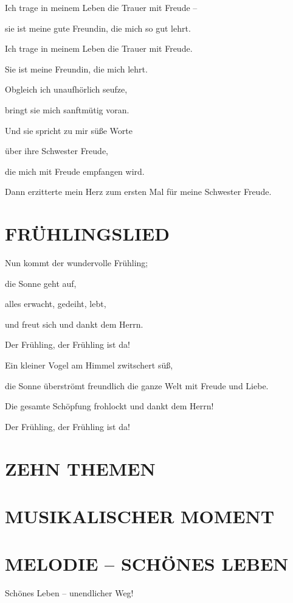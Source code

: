 \documentclass[11pt,a5paper,twoside]{article}
\begin{document}
Ich trage in meinem Leben die Trauer mit Freude --

sie ist meine gute Freundin, die mich so gut lehrt. 

Ich trage in meinem Leben die Trauer mit Freude.

Sie ist meine Freundin, die mich lehrt.

Obgleich ich unaufhörlich seufze, 

bringt sie mich sanftmütig voran. 

Und sie spricht zu mir süße Worte

über ihre Schwester Freude,

die mich mit Freude empfangen wird.

Dann erzitterte mein Herz zum ersten Mal für meine Schwester Freude.

\section[Frühlingslied]{FRÜHLINGSLIED}

Nun kommt der wundervolle Frühling; 

die Sonne geht auf, 

alles erwacht, gedeiht, lebt, 

und freut sich und dankt dem Herrn.

Der Frühling, der Frühling ist da!

Ein kleiner Vogel am Himmel zwitschert süß, 

die Sonne überströmt freundlich die ganze Welt mit Freude und Liebe.

Die gesamte Schöpfung frohlockt und dankt dem Herrn! 

Der Frühling, der Frühling ist da!

\section[Zehn Themen]{ZEHN THEMEN}

\section[Musikalischer Moment]{MUSIKALISCHER MOMENT}

\section[Melodie 1 -- Schönes Leben]{MELODIE -- SCHÖNES LEBEN}

Schönes Leben -- unendlicher Weg!
\end{document}
